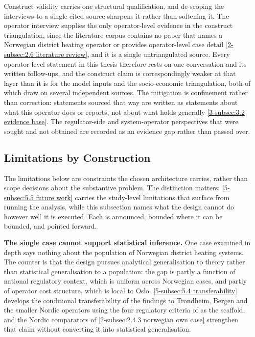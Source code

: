 Construct validity carries one structural qualification, and de-scoping the interviews to a single cited source sharpens it rather than softening it. The operator interview supplies the only operator-level evidence in the construct triangulation, since the literature corpus contains no paper that names a Norwegian district heating operator or provides operator-level case detail \autoref{2-subsec:2.6 literature review}, and it is a single untriangulated source. Every operator-level statement in this thesis therefore rests on one conversation and its written follow-ups, and the construct claim is correspondingly weaker at that layer than it is for the model inputs and the socio-economic triangulation, both of which draw on several independent sources. The mitigation is confinement rather than correction: statements sourced that way are written as statements about what this operator does or reports, not about what holds generally \autoref{3-subsec:3.2 evidence base}. The regulator-side and system-operator perspectives that were sought and not obtained are recorded as an evidence gap rather than passed over.

\subsection{Limitations by Construction}
\label{3-subsec:3.10 limitations}

The limitations below are constraints the chosen architecture carries, rather than scope decisions about the substantive problem. The distinction matters: \autoref{5-subsec:5.5 future work} carries the study-level limitations that surface from running the analysis, while this subsection names what the design cannot do however well it is executed. Each is announced, bounded where it can be bounded, and pointed forward.

\textbf{The single case cannot support statistical inference.} One case examined in depth says nothing about the population of Norwegian district heating systems. The counter is that the design pursues analytical generalisation to theory rather than statistical generalisation to a population: the gap is partly a function of national regulatory context, which is uniform across Norwegian cases, and partly of operator cost structure, which is local to Oslo. \autoref{5-subsec:5.4 transferability} develops the conditional transferability of the findings to Trondheim, Bergen and the smaller Nordic operators using the four regulatory criteria of \cite{bergaentzle_electricity_2019} as the scaffold, and the Nordic comparators of \autoref{2-subsec:2.4.3 norwegian own case} strengthen that claim without converting it into statistical generalisation.

